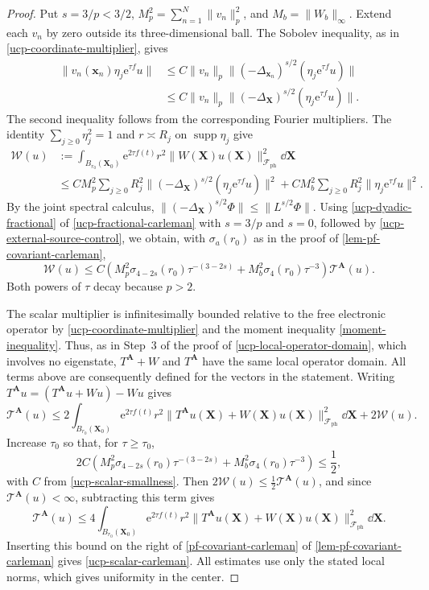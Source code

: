 \documentclass[final,reqno]{amsart}
\DeclareMathOperator{\supp}{supp}
\theoremstyle{remark}
\newcommand{\e}{\mathrm{e}}
\newcommand{\ph}{\mathrm{ph}}
\newcommand{\Fock}{\mathcal{F}}
\newcommand{\vx}{\mathbf{x}}
\newcommand{\vA}{{\mathbf{A}}}
\newcommand{\vX}{{\mathbf{X}}}
\begin{document}
\begin{proof}
Put $s=3/p<3/2$, $M_p^2=\sum_{n=1}^N\|v_n\|_p^2$, and
$M_b=\|W_b\|_\infty$.  Extend each $v_n$ by zero outside its
three-dimensional ball.  The Sobolev
inequality, as in \cref{ucp-coordinate-multiplier}, gives
\begin{align*}
 \|v_n(\vx_n)\eta_j\e^{\tau f}u\|
 &\leq C\|v_n\|_p\|(-\Delta_{\vx_n})^{s/2}(\eta_j\e^{\tau f}u)\|\\
 &\leq C\|v_n\|_p\|(-\Delta_{\vX})^{s/2}(\eta_j\e^{\tau f}u)\|.
\end{align*}
The second inequality follows from the corresponding Fourier
multipliers.  The identity
$\sum_{j\geq0}\eta_j^2=1$ and $r\asymp R_j$ on $\supp\eta_j$ give
\begin{align*}
 \mathcal W(u)&:=\int_{B_{r_0}(\vX_0)}\e^{2\tau f(t)}r^2
                       \|W(\vX)u(\vX)\|_{\Fock_\ph}^2\dd\vX\\
 &\leq C M_p^2\sum_{j\geq0}R_j^2
                   \|(-\Delta_{\vX})^{s/2}(\eta_j\e^{\tau f}u)\|^2
       +C M_b^2\sum_{j\geq0}R_j^2\|\eta_j\e^{\tau f}u\|^2.
\end{align*}
By the joint spectral calculus,
$\|(-\Delta_{\vX})^{s/2}\Phi\|\leq\|L^{s/2}\Phi\|$.  Using \cref{ucp-dyadic-fractional} of \cref{ucp-fractional-carleman} with
$s=3/p$ and $s=0$, followed by \cref{ucp-external-source-control},
we obtain, with $\sigma_a(r_0)$ as in the proof of
\cref{lem-pf-covariant-carleman},
\begin{equation}\label{ucp-scalar-smallness}
 \mathcal W(u)\leq C\left(
       M_p^2\sigma_{4-2s}(r_0)\tau^{-(3-2s)}
                 +M_b^2\sigma_4(r_0)\tau^{-3}\right)\mathcal T^{\vA}(u).
\end{equation}
Both powers of $\tau$ decay because $p>2$.

The scalar multiplier is infinitesimally bounded relative to the
free electronic operator by \cref{ucp-coordinate-multiplier} and the
moment inequality \cref{moment-inequality}.  Thus, as in Step~3 of the
proof of \cref{ucp-local-operator-domain}, which involves no
eigenstate, $T^{\vA}+W$ and $T^{\vA}$ have the same local operator
domain.  All terms above are consequently defined for the vectors
in the statement.  Writing $T^{\vA}u=(T^{\vA}u+Wu)-Wu$ gives
\[
 \mathcal T^{\vA}(u)\leq2\int_{B_{r_0}(\vX_0)}\e^{2\tau f(t)}r^2
                       \|T^{\vA}u(\vX)+W(\vX)u(\vX)\|_{\Fock_\ph}^2\dd\vX
                       +2\mathcal W(u).
\]
Increase $\tau_0$ so that, for $\tau\geq\tau_0$,
\[
 2C\left(M_p^2\sigma_{4-2s}(r_0)\tau^{-(3-2s)}
        +M_b^2\sigma_4(r_0)\tau^{-3}\right)\leq\frac12,
\]
with $C$ from \cref{ucp-scalar-smallness}.  Then
$2\mathcal W(u)\leq\frac12\mathcal T^{\vA}(u)$, and since
$\mathcal T^{\vA}(u)<\infty$, subtracting this term gives
\[
 \mathcal T^{\vA}(u)\leq4\int_{B_{r_0}(\vX_0)}\e^{2\tau f(t)}r^2
                       \|T^{\vA}u(\vX)+W(\vX)u(\vX)\|_{\Fock_\ph}^2\dd\vX.
\]
Inserting this bound on the right of \cref{pf-covariant-carleman} of \cref{lem-pf-covariant-carleman}
gives \cref{ucp-scalar-carleman}.  All estimates use
only the stated local norms, which gives uniformity in the center.
\end{proof}
\end{document}
